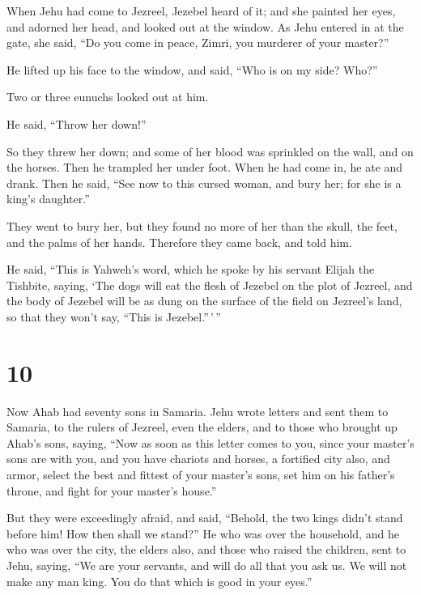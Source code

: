  When Jehu had come to Jezreel, Jezebel heard of it; and
she painted her eyes, and adorned her head, and looked out at the
window.  As Jehu entered in at the gate, she said, ``Do you
come in peace, Zimri, you murderer of your master?''

 He lifted up his face to the window, and said, ``Who is on
my side? Who?''

Two or three eunuchs looked out at him.

 He said, ``Throw her down!''

So they threw her down; and some of her blood was sprinkled on the wall,
and on the horses. Then he trampled her under foot.  When
he had come in, he ate and drank. Then he said, ``See now to this cursed
woman, and bury her; for she is a king's daughter.''

 They went to bury her, but they found no more of her than
the skull, the feet, and the palms of her hands.  Therefore
they came back, and told him.

He said, ``This is Yahweh's word, which he spoke by his servant Elijah
the Tishbite, saying, `The dogs will eat the flesh of Jezebel on the
plot of Jezreel,  and the body of Jezebel will be as dung
on the surface of the field on Jezreel's land, so that they won't say,
``This is Jezebel.''\,'\,''

\hypertarget{section-9}{%
\section{10}\label{section-9}}

 Now Ahab had seventy sons in Samaria. Jehu wrote letters
and sent them to Samaria, to the rulers of Jezreel, even the elders, and
to those who brought up Ahab's sons, saying,  ``Now as soon
as this letter comes to you, since your master's sons are with you, and
you have chariots and horses, a fortified city also, and armor,
 select the best and fittest of your master's sons, set him
on his father's throne, and fight for your master's house.''

 But they were exceedingly afraid, and said, ``Behold, the
two kings didn't stand before him! How then shall we stand?''
 He who was over the household, and he who was over the
city, the elders also, and those who raised the children, sent to Jehu,
saying, ``We are your servants, and will do all that you ask us. We will
not make any man king. You do that which is good in your eyes.''

